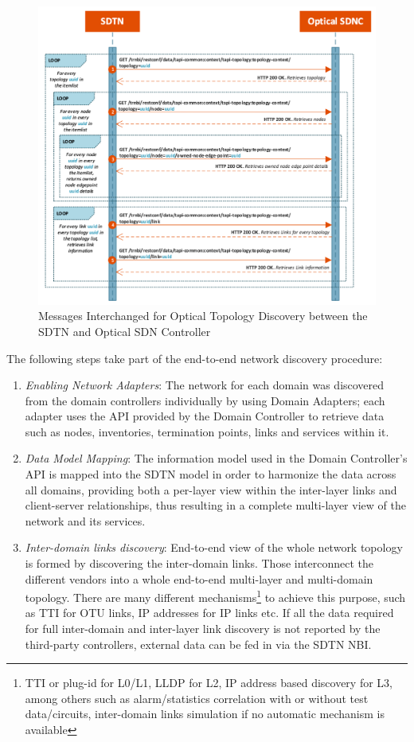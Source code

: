 \documentclass[a4paper,fleqn]{cas-dc}
\begin{document}
\begin{figure}
	\centering
		\includegraphics[width=\linewidth]{figs/optical_topology_workflow_2.png}
	\caption{Messages Interchanged for Optical Topology Discovery between the SDTN and Optical SDN Controller}
	\label{FIG:optical_topology_workflow}
\end{figure}

The following steps take part of the end-to-end network discovery procedure:
\begin{enumerate}
    \item \textit{Enabling Network Adapters}: The network for each domain was discovered from the domain controllers individually by using Domain Adapters; each adapter uses the API provided by the Domain Controller to retrieve data such as nodes, inventories, termination points, links and services within it.
    \item \textit{Data Model Mapping}: The information model used in the Domain Controller's API is mapped into the SDTN model in order to harmonize the data across all domains, providing both a per-layer view within the inter-layer links and client-server relationships, thus resulting in a complete multi-layer view of the network and its services.
    \item \textit{Inter-domain links discovery}: End-to-end view of the whole network topology is formed by discovering the inter-domain links. Those interconnect the different vendors into a whole end-to-end multi-layer and multi-domain topology. There are many different mechanisms\footnote{TTI or plug-id for L0/L1, LLDP for L2, IP address based discovery for L3, among others such as alarm/statistics correlation with or without test data/circuits, inter-domain links simulation if no automatic mechanism is available} 
    to achieve this purpose, such as TTI for OTU links, IP addresses for IP links etc. If all the data required for full inter-domain and inter-layer link discovery is not reported by the third-party controllers, external data can be fed in via the SDTN NBI. 
\end{enumerate}
\end{document}
